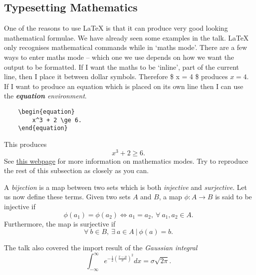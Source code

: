 \documentclass{article}
\begin{document}
\subsection{Typesetting Mathematics}
\label{sub:typesetting_mathematics}

One of the reasons to use \LaTeX{} is that it can produce very good looking mathematical formulae. We have already seen some examples in the talk. \LaTeX{} only recognises mathematical commands while in `maths mode'. There are a few ways to enter maths mode -- which one we use depends on how we want the output to be formatted. If I want the maths to be `inline', part of the current line, then I place it between dollar symbols. Therefore \$ x = 4 \$ produces $x=4$. If I want to produce an equation which is placed on its own line then I can use the \emph{\textbf{equation} environment}.
\begin{verbatim}
	\begin{equation}
	    x^3 + 2 \ge 6.
	\end{equation}
\end{verbatim}
This produces
\begin{equation}
	x^3 + 2 \ge 6.
\end{equation}
See \href{https://www.overleaf.com/learn/latex/Mathematical_expressions}{this webpage} for more information on mathematics modes. Try to reproduce the rest of this subsection as closely as you can.

A \emph{bijection} is a map between two sets which is both \emph{injective} and \emph{surjective}. Let us now define these terms. Given two sets $A$ and $B$, a map $\phi:A \to B$ is said to be injective if
\begin{equation}\label{eq:injective} %
	\phi(a_1) = \phi(a_2) \iff a_1 = a_2,\ \forall\ a_1,a_2 \in A.
\end{equation}
Furthermore, the map is surjective if
\begin{equation}\label{eq:surjective}
	\forall\ b \in B,\ \exists\ a \in A\ |\ \phi(a)=b.
\end{equation}

The talk also covered the import result of the \emph{Gaussian integral}
\begin{equation}
	\int_{-\infty}^\infty e^{-\frac{1}{2}\left( \frac{x - \mu}{\sigma} \right)^2} dx = \sigma\sqrt{2 \pi}.
\end{equation}
\end{document}
